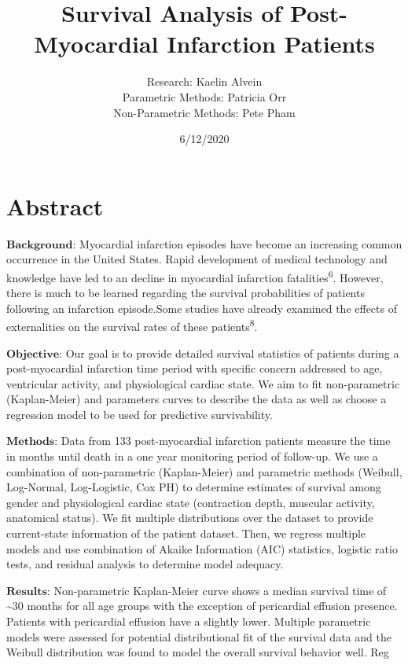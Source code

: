 \documentclass[
]{article}
\title{Survival Analysis of Post-Myocardial Infarction Patients}
\author{Research: Kaelin Alvein\\
Parametric Methods: Patricia Orr\\
Non-Parametric Methods: Pete Pham}
\date{6/12/2020}
\begin{document}
\maketitle

\hypertarget{abstract}{%
\section{Abstract}\label{abstract}}

\(\textbf{Background:}\) Myocardial infarction episodes have become an
increasing common occurrence in the United States. Rapid development of
medical technology and knowledge have led to an decline in myocardial
infarction fatalities\textsuperscript{6}. However, there is much to be
learned regarding the survival probabilities of patients following an
infarction episode.Some studies have already examined the effects of
externalities on the survival rates of these
patients\textsuperscript{8}.

\(\textbf{Objective:}\) Our goal is to provide detailed survival
statistics of patients during a post-myocardial infarction time period
with specific concern addressed to age, ventricular activity, and
physiological cardiac state. We aim to fit non-parametric (Kaplan-Meier)
and parameters curves to describe the data as well as choose a
regression model to be used for predictive survivability.

\(\textbf{Methods:}\) Data from 133 post-myocardial infarction patients
measure the time in months until death in a one year monitoring period
of follow-up. We use a combination of non-parametric (Kaplan-Meier) and
parametric methods (Weibull, Log-Normal, Log-Logistic, Cox PH) to
determine estimates of survival among gender and physiological cardiac
state (contraction depth, muscular activity, anatomical status). We fit
multiple distributions over the dataset to provide current-state
information of the patient dataset. Then, we regress multiple models and
use combination of Akaike Information (AIC) statistics, logistic ratio
tests, and residual analysis to determine model adequacy.

\(\textbf{Results:}\) Non-parametric Kaplan-Meier curve shows a median
survival time of \textasciitilde30 months for all age groups with the
exception of pericardial effusion presence. Patients with pericardial
effusion have a slightly lower. Multiple parametric models were assessed
for potential distributional fit of the survival data and the Weibull
distribution was found to model the overall survival behavior well. Reg
\end{document}
